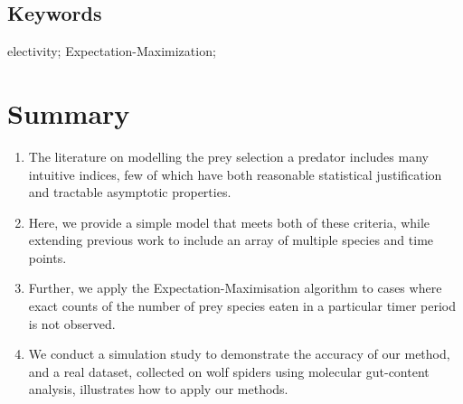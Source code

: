 \documentclass[12pt]{article}
\begin{document}
\subsection*{Keywords}
electivity; Expectation-Maximization; 

\newpage
\section*{Summary}
\label{sec:abstract}

\begin{enumerate}
\item The literature on modelling the prey selection a predator includes many intuitive indices, few of which have both reasonable statistical justification and tractable asymptotic properties.
\item Here, we provide a simple model that meets both of these criteria, while extending previous work to include an array of multiple species and time points.
\item Further, we apply the Expectation-Maximisation algorithm to cases where exact counts of the number of prey species eaten in a particular timer period is not observed.
\item We conduct a simulation study to demonstrate the accuracy of our method, and a real dataset, collected on wolf spiders using molecular gut-content analysis, illustrates how to apply our methods.
\end{enumerate}












\end{document}
